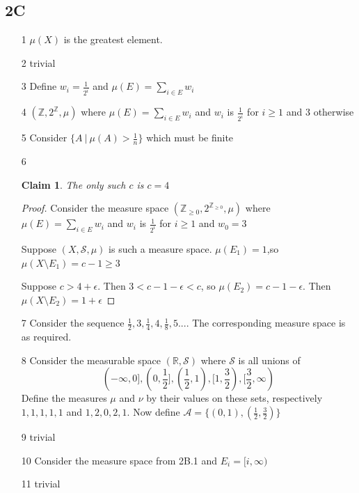 \documentclass{article}
\newtheorem*{claim}{Claim}
\begin{document}
\subsection*{2C}
\begin{itemize}
    \item [1] $\mu(X)$ is the greatest element.
    \item [2] trivial
    \item [3] Define $w_i=\frac{1}{2^i}$ and $\mu(E)=\sum_{i \in E} w_i$
    \item [4] $(\mathbb{Z},2^\mathbb{Z},\mu)$ where $\mu(E)=\sum_{i \in E} w_i$ and $w_i$ is $\frac{1}{2^i}$ for $i \geq 1$ and $3$ otherwise
    \item [5] Consider $\{ A \ | \ \mu(A) > \frac{1}{n}\}$ which must be finite
    \item [6] \begin{claim}
        The only such $c$ is $c=4$
    \end{claim}
    \begin{proof}
        Consider the measure space $(\mathbb{Z}_{\geq0},2^{\mathbb{Z}_{\geq0}},\mu)$ where $\mu(E)=\sum_{i \in E} w_i$ and $w_i$ is $\frac{1}{2^i}$ for $i \geq 1$ and $w_0=3$

        Suppose $(X,\mathcal{S},\mu)$ is such a measure space. 
        $\mu(E_1)=1$,so $\mu(X\setminus E_1)=c-1\geq3$

        Suppose $c > 4+\epsilon$. Then $3<c-1-\epsilon<c$, so $\mu(E_2)=c-1-\epsilon$. Then $\mu(X\setminus E_2)=1+\epsilon$
        
    \end{proof}
    \item [7] Consider the sequence $\frac{1}{2},3,\frac{1}{4},4,\frac{1}{8},5...$. The corresponding measure space is as required.

    \item[8] Consider the measurable space $(\mathbb{R},\mathcal{S})$ where $\mathcal{S}$ is all unions of \[(-\infty,0],(0,\frac{1}{2}],(\frac{1}{2},1),[1,\frac{3}{2}),[\frac{3}{2},\infty)\]
             Define the measures $\mu$ and $\nu$ by their values on these sets, respectively $1,1,1,1,1$ and $1,2,0,2,1$. Now define $\mathcal{A}=\{(0,1),(\frac{1}{2},\frac{3}{2})\}$

    \item[9] trivial
    \item[10] Consider the measure space from 2B.1 and $E_i=[i,\infty)$
    \item [11] trivial
    
\end{itemize}
\end{document}
